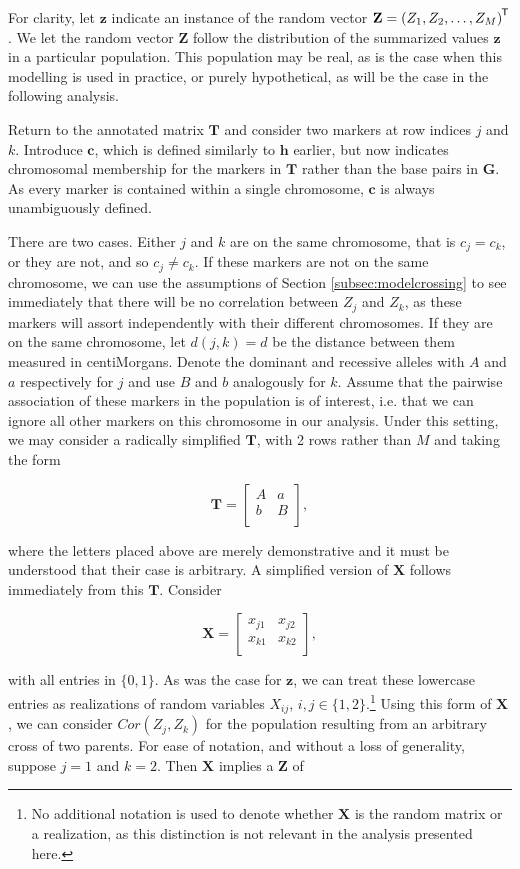 \documentclass{article}
\newcommand{\ve}[1]{\mathbf{#1}}           %
\newcommand{\m}[1]{\mathbf{#1}}               %
\newcommand{\tr}[1]{{#1}^{\mkern-1.5mu\mathsf{T}}}              %
\begin{document}
For clarity, let $\ve{z}$ indicate an instance of the random vector $\ve{Z} = \tr{(Z_1, Z_2, \dots, Z_M)}$. We let the random vector $\ve{Z}$ follow the distribution of the summarized values $\ve{z}$ in a particular population. This population may be real, as is the case when this modelling is used in practice, or purely hypothetical, as will be the case in the following analysis.

Return to the annotated matrix $\m{T}$ and consider two markers at row indices $j$ and $k$. Introduce $\ve{c}$, which is defined similarly to $\ve{h}$ earlier, but now indicates chromosomal membership for the markers in $\m{T}$ rather than the base pairs in $\m{G}$. As every marker is contained within a single chromosome, $\ve{c}$ is always unambiguously defined.

There are two cases. Either $j$ and $k$ are on the same chromosome, that is $c_j = c_k$, or they are not, and so $c_j \neq c_k$. If these markers are not on the same chromosome, we can use the assumptions of Section \ref{subsec:modelcrossing} to see immediately that there will be no correlation between $Z_j$ and $Z_k$, as these markers will assort independently with their different chromosomes. If they are on the same chromosome, let $d(j,k) = d$ be the distance between them measured in centiMorgans. Denote the dominant and recessive alleles with $A$ and $a$ respectively for $j$ and use $B$ and $b$ analogously for $k$. Assume that the pairwise association of these markers in the population is of interest, i.e. that we can ignore all other markers on this chromosome in our analysis. Under this setting, we may consider a radically simplified $\m{T}$, with 2 rows rather than $M$ and taking the form

$$\m{T} = \begin{bmatrix}
  A & a \\
  b & B \\
\end{bmatrix},$$

\noindent where the letters placed above are merely demonstrative and it must be understood that their case is arbitrary. A simplified version of $\m{X}$ follows immediately from this $\m{T}$. Consider

$$\m{X} = \begin{bmatrix}
  x_{j1} & x_{j2} \\
  x_{k1} & x_{k2} \\
\end{bmatrix},$$

\noindent with all entries in $\{0,1\}$. As was the case for $\ve{z}$, we can treat these lowercase entries as realizations of random variables $X_{ij}$, $i,j \in \{1,2\}$.\footnote{No additional notation is used to denote whether $\m{X}$ is the random matrix or a realization, as this distinction is not relevant in the analysis presented here.} Using this form of $\m{X}$, we can consider $Cor(Z_j, Z_k)$ for the population resulting from an arbitrary cross of two parents. For ease of notation, and without a loss of generality, suppose $j = 1$ and $k = 2$. Then $\m{X}$ implies a $\ve{Z}$ of
\end{document}
